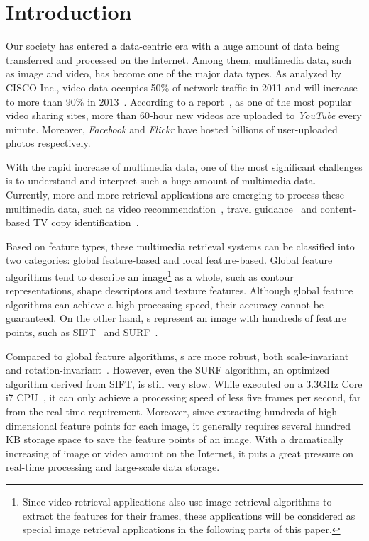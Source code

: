 \section{Introduction}
\label{sec:introduction}

Our society has entered a data-centric era with a huge amount of data being transferred and processed on the Internet. Among them, multimedia data, such as image and video, has become one of the major data types. As analyzed by CISCO Inc., video data occupies 50\% of network traffic in 2011 and will increase to more than 90\% in 2013~\cite{index2010forecast}. According to a report~\cite{jansohn2009detecting}, as one of the most popular video sharing sites, more than 60-hour new videos are uploaded to \emph{YouTube} every minute. Moreover, \emph{Facebook} and \emph{Flickr} have hosted billions of user-uploaded photos respectively.

With the rapid increase of multimedia data, one of the most significant challenges is to understand and interpret such a huge amount of multimedia data. Currently, more and more retrieval applications are emerging to process these multimedia data, such as video recommendation~\cite{videorecommendation2007}, travel guidance~\cite{travelguidance2010} and content-based TV copy identification~\cite{tvidentify2003}. 

Based on feature types, these multimedia retrieval systems can be classified into two categories: global feature-based and local feature-based. Global feature algorithms tend to describe an image\footnote{Since video retrieval applications also use image retrieval algorithms to extract the features for their frames, these applications will be considered as special image retrieval applications in the following parts of this paper.} as a whole, such as contour representations, shape descriptors and texture features. Although global feature algorithms can achieve a high processing speed, their accuracy cannot be guaranteed. On the other hand, {\lfea}s represent  an image with hundreds of feature points, such as SIFT~\cite{lowe1999object,lowe2004distinctive} and SURF~\cite{Bay2006SURF,Evans20009OpenSURF}. 

Compared to global feature algorithms, {\lfea}s are more robust, both scale-invariant and rotation-invariant~\cite{mikolajczyk2005performance}\cite{Bauer2007Evaluation}. However, even the SURF algorithm, an optimized algorithm derived from SIFT, is still very slow. While executed on a 3.3GHz Core i7 CPU~\cite{adaptivepipelineicpp2012}, it can only achieve a processing speed of less five frames per second, far from the real-time requirement. Moreover, since extracting hundreds of high-dimensional feature points for each image, it generally requires several hundred KB storage space to save the feature points of an image. With a dramatically increasing of image or video amount on the Internet, it puts a great pressure on real-time processing and large-scale data storage.

